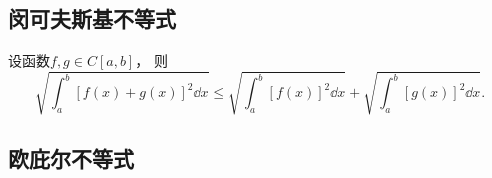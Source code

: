\subsection{闵可夫斯基不等式}
\begin{theorem}[闵可夫斯基不等式]\label{theorem:定积分.闵可夫斯基不等式}
设函数\(f,g \in C[a,b]\)，
则\begin{equation}\label{equation:定积分.闵可夫斯基不等式}
	\sqrt{ \int_a^b [f(x)+g(x)]^2 \dd{x} }
	\leq \sqrt{ \int_a^b [f(x)]^2 \dd{x} }
			+ \sqrt{ \int_a^b [g(x)]^2 \dd{x} }.
\end{equation}
\end{theorem}

\subsection{欧庇尔不等式}
